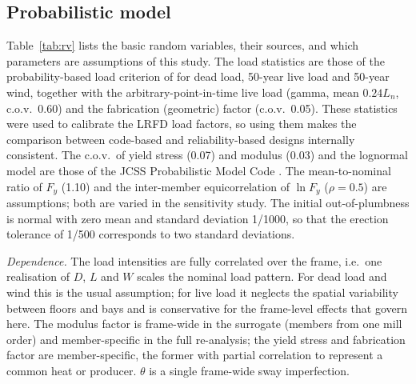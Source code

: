 \subsection{Probabilistic model}\label{sec:probmodel}

Table~\ref{tab:rv} lists the basic random variables, their sources, and which parameters are
assumptions of this study. The load statistics are those of the probability-based load criterion
of \citet{Ellingwood1980} for dead load, 50-year live load and 50-year wind, together with the
arbitrary-point-in-time live load (gamma, mean $0.24L_n$, c.o.v.\ 0.60) and the fabrication
(geometric) factor (c.o.v.\ 0.05). These statistics were used to calibrate the LRFD load factors,
so using them makes the comparison between code-based and reliability-based designs internally
consistent. The c.o.v.\ of yield stress (0.07) and modulus (0.03) and the lognormal model are those
of the JCSS Probabilistic Model Code \citep{JCSS2001}. The mean-to-nominal ratio of $F_y$ (1.10)
and the inter-member equicorrelation of $\ln F_y$ ($\rho=0.5$) are assumptions; both are varied
in the sensitivity study. The initial out-of-plumbness is normal with zero mean and standard
deviation 1/1000, so that the erection tolerance of 1/500 corresponds to two standard deviations.

\emph{Dependence.} The load intensities are fully correlated over the frame, i.e.\ one realisation
of $D$, $L$ and $W$ scales the nominal load pattern. For dead load and wind this is the usual
assumption; for live load it neglects the spatial variability between floors and bays and is
conservative for the frame-level effects that govern here. The modulus factor is frame-wide in the
surrogate (members from one mill order) and member-specific in the full re-analysis; the yield
stress and fabrication factor are member-specific, the former with partial correlation to
represent a common heat or producer. $\theta$ is a single frame-wide sway imperfection.

